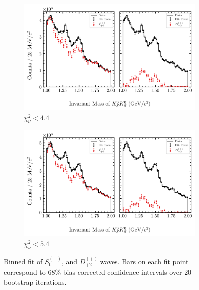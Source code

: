 \begin{figure}[htbp]
    \begin{subfigure}{0.45\textwidth}
        \includegraphics[width=\linewidth]{figures/binned_fit_chisqdof_4.4_splot_D_1s_2b_phase_factor_waves491_uncertainty_bootstrap-CI-BC.png}
        \caption{$\chi^2_\nu < 4.4$}
    \end{subfigure}
    \hfill
    \begin{subfigure}{0.45\textwidth}
        \includegraphics[width=\linewidth]{figures/binned_fit_chisqdof_5.4_splot_D_1s_2b_phase_factor_waves491_uncertainty_bootstrap-CI-BC.png}
        \caption{$\chi^2_\nu < 5.4$}
    \end{subfigure}

    \caption{Binned fit of $S_{0}^{(+)}$, and $D_{+2}^{(+)}$ waves. Bars on each fit point correspond to $68\%$ bias-corrected confidence intervals over $20$ bootstrap iterations.}
    \label{fig:binned-fit-all-Sp-D2p}
\end{figure}

